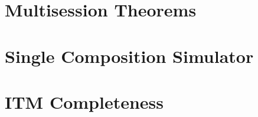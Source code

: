 \documentclass[conference]{IEEEtran}
\begin{document}
\section{Multisession Theorems} \label{app:ms}


\section{Single Composition Simulator} \label{app:simcomp}


%
%
%
%
%

\section{ITM Completeness} \label{app:itm}


\pagebreak
\end{document}
